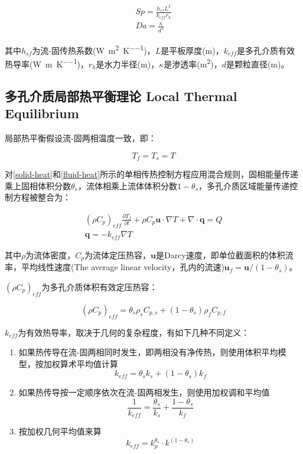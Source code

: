 \begin{gather}
Sp = \frac{h_{sf}L^2}{k_{eff}r_h} \\
Da = \frac{\kappa}{d^2}
\end{gather}

其中$ h_{sf} $为流-固传热系数(\si{\watt\per\meter\squared\per\kelvin})，$ L $是平板厚度(\si{\meter})，$ k_{eff} $是多孔介质有效热导率(\si{\watt\per\meter\per\kelvin})，$ r_h $是水力半径(\si{\meter})，$ \kappa $是渗透率(\si{\square\meter})，$ d $是颗粒直径(\si{\meter})。

\subsection{多孔介质局部热平衡理论 Local Thermal Equilibrium}
局部热平衡假设流-固两相温度一致，即：

\[T_f=T_s=T\]

对\autoref{solid-heat}和\autoref{fluid-heat}所示的单相传热控制方程应用混合规则，固相能量传递乘上固相体积分数$ \theta_s $，流体相乘上流体体积分数$ 1-\theta_s $，多孔介质区域能量传递控制方程被整合为：

\begin{gather}
(\rho C_p)_{eff} \frac{\partial T_f}{\partial t} + \rho C_p\bm{u}\cdot\nabla T + \nabla\cdot\bm{q} = Q \\
\bm{q} = -k_{eff}\nabla T
\end{gather}

其中$ \rho $为流体密度，$ C_p $为流体定压热容，$ \bm{u} $是Darcy速度，即单位截面积的体积流率，平均线性速度(The average linear velocity，孔内的流速)$ \bm{u}_f=\bm{u}/(1-\theta_s) $。

$ (\rho C_p)_{eff} $为多孔介质体积有效定压热容：

\[(\rho C_p)_{eff} = \theta_s\rho_sC_{p,s} + (1-\theta_s)\rho_f C_{p,f}\]

$ k_{eff} $为有效热导率，取决于几何的复杂程度，有如下几种不同定义：

\begin{enumerate}
    \item 如果热传导在流-固两相同时发生，即两相没有净传热，则使用体积平均模型，按加权算术平均值计算
    \[k_{eff} =\theta_s k_s + (1-\theta_s)k_f\]
    \item 如果热传导按一定顺序依次在流-固两相发生，则使用加权调和平均值
    \[\frac{1}{k_{eff}} = \frac{\theta_s}{k_s} + \frac{1-\theta_s}{k_f} \]
    \item 按加权几何平均值来算
    \[k_{eff} = k_p^{\theta_s}\cdot k^(1-\theta_s) \]
\end{enumerate}

